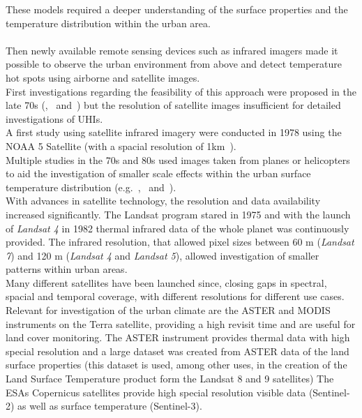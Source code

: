 \documentclass[12pt,a4paper, english,twoside]{scrartcl}
\begin{document}
  These models required a deeper understanding of the surface properties and the temperature distribution within the urban area.\\ \\
  Then newly available remote sensing devices such as infrared imagers made it possible to observe the urban environment from above and detect temperature hot spots using airborne and satellite images.  \\
  First investigations regarding the feasibility of this approach were proposed in the late 70s (\cite{Watson1975},~\cite{Carlson1977} and~\cite{Block1978}) but the resolution of satellite images insufficient for detailed investigations of \glspl{UHI}.\\
  A first study using satellite infrared imagery were conducted in 1978 using the NOAA 5 Satellite (with a spacial resolution of 1km~\autocite{Matson1978}).\\
  Multiple studies in the 70s and 80s used images taken from planes or helicopters to aid the investigation of smaller scale effects within the urban surface temperature distribution (e.g.~\cite{Landsberg1979},~\cite{ljungberg1980use} and~\cite{Foster1981}). \\
  With advances in satellite technology, the resolution and data availability increased significantly. 
  The Landsat program stared in 1975 and with the launch of \textit{Landsat 4} in 1982 thermal infrared data of the whole planet was continuously provided. 
  The infrared resolution, that allowed pixel sizes between 60 m (\textit{Landsat 7}) and 120 m (\textit{Landsat 4} and \textit{Landsat 5}), allowed investigation of smaller patterns within urban areas.\\
  Many different satellites have been launched since, closing gaps in spectral, spacial and temporal coverage, with different resolutions for different use cases. 
  Relevant for investigation of the urban climate are the ASTER and MODIS instruments on the Terra satellite, providing a high revisit time and are useful for land cover monitoring. 
  The ASTER instrument provides thermal data with high special resolution and a large dataset was created from ASTER data of the land surface properties (this dataset is used, among other uses, in the creation of the Land Surface Temperature product form the Landsat 8 and 9 satellites)
  The \glspl{ESA} Copernicus satellites provide high special resolution visible data (Sentinel-2) as well as surface temperature (Sentinel-3). \\
\end{document}
